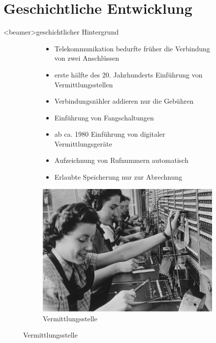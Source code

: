 
\section{Geschichtliche Entwicklung}
    \begin{frame}<beamer>{geschichtlicher Hintergrund}
      \begin{figure}
        \begin{subfigure}[b]{0.5\textwidth}
          \begin{itemize}
            \item
              Telekommunikation bedurfte früher die Verbindung von zwei Anschlüssen
            \item
              erste hälfte des 20. Jahrhunderts Einführung von Vermittlungsstellen
            \item
              Verbindungszähler addieren nur die Gebühren
            \item
              Einführung von Fangschaltungen
            \item 
             ab ca. 1980 Einführung von digitaler Vermittlungsgeräte
            \item
              Aufzeichnung von Rufnummern automatisch
            \item
              Erlaubte Speicherung nur zur Abrechnung
          \end{itemize}
        \end{subfigure}
        \begin{subfigure}[b]{0.3\textwidth}
          \includegraphics[scale=1]{sections/img/vermittlungsstellen.jpg}
          \caption{Vermittlungsstelle}
          \label{fig:vermittlungsstelle}
        \end{subfigure}
      \end{figure}
    \end{frame}


